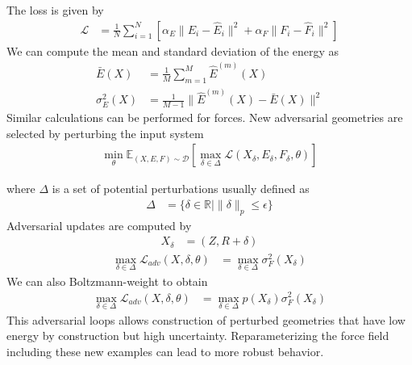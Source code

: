 \documentclass[book.tex]{subfiles}
\begin{document}


The loss is given by
\begin{align}
\mathcal{L} &= \frac{1}{N} \sum_{i=1}^N [\alpha_E \|E_i -\hat{E}_i\|^2 + \alpha_F \|F_i - \hat{F}_i\|^2]
\end{align}
We can compute the mean and standard deviation of the energy as
\begin{align}
\bar{E}(X) &= \frac{1}{M} \sum_{m=1}^M \hat{E}^{(m)}(X) \\
\sigma_E^2(X) &= \frac{1}{M-1} \|\hat{E}^{(m)}(X) - \bar{E}(X)\|^2
\end{align}
Similar calculations can be performed for forces. New adversarial geometries are selected by perturbing the input system
\begin{align}
\min_\theta \mathbb{E}_{(X, E, F) \sim \mathcal{D}} \left [ \max_{\delta \in \Delta} \mathcal{L}(X_\delta, E_\delta, F_\delta, \theta) \right ]
\end{align}

where $\Delta$ is a set of potential perturbations usually defined as
\begin{align}
\Delta &= \{ \delta \in \mathbb{R} | \|\delta\|_p \leq \epsilon \}
\end{align}
Adversarial updates are computed by
\begin{align}
X_\delta &= (Z, R + \delta)
\end{align}
\begin{align}
\max_{\delta \in \Delta} \mathcal{L}_{adv}(X, \delta, \theta) &= \max_{\delta \in \Delta} \sigma^2_F(X_\delta)
\end{align}
We can also Boltzmann-weight to obtain
\begin{align}
\max_{\delta \in \Delta} \mathcal{L}_{adv}(X, \delta, \theta) &= \max_{\delta \in \Delta} p(X_\delta) \sigma^2_F(X_\delta)
\end{align}
This adversarial loops allows construction of perturbed geometries that have low energy by construction but high uncertainty. Reparameterizing the force field including these new examples can lead to more robust behavior.
\end{document}
